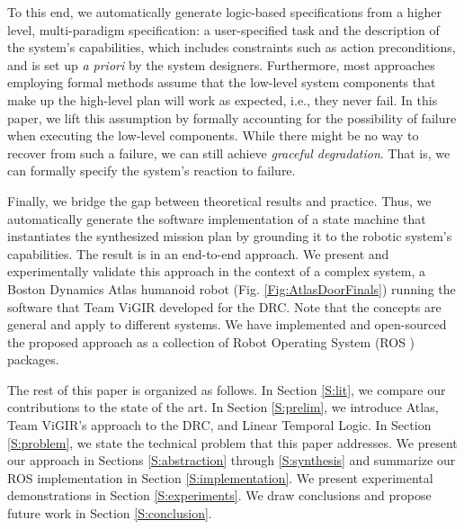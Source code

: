 To this end, we automatically generate logic-based specifications from a higher level, multi-paradigm specification: a user-specified task and the description of the system's capabilities, which includes constraints such as action preconditions, and is set up \emph{a priori} by the system designers.
Furthermore, most approaches employing formal methods assume that the low-level system components that make up the high-level plan will work as expected, i.e., they never fail.
In this paper, we lift this assumption by formally accounting for the possibility of failure when executing the low-level components.
While there might be no way to recover from such a failure, we can still achieve \emph{graceful degradation}.
That is, we can formally specify the system's reaction to failure.

Finally, we bridge the gap between theoretical results and practice. 
Thus, we automatically generate the software implementation of a state machine that instantiates the synthesized mission plan by grounding it to the robotic system's capabilities.
The result is in an end-to-end approach.
We present and experimentally validate this approach in the context of a complex system, a Boston Dynamics Atlas humanoid robot (Fig. \ref{Fig:AtlasDoorFinals}) running the software that Team ViGIR developed for the DRC.
Note that the concepts are general and apply to different systems.
We have implemented and open-sourced the proposed approach as a collection of Robot Operating System (ROS \cite{ROS}) packages.

The rest of this paper is organized as follows.
In Section \ref{S:lit}, we compare our contributions to the state of the art.
In Section \ref{S:prelim}, we introduce Atlas, Team ViGIR's approach to the DRC, and Linear Temporal Logic.
In Section \ref{S:problem}, we state the technical problem that this paper addresses.
We present our approach in Sections \ref{S:abstraction} through \ref{S:synthesis} and summarize our ROS implementation in Section \ref{S:implementation}.
We present experimental demonstrations in Section \ref{S:experiments}.
We draw conclusions and propose future work in Section \ref{S:conclusion}.

